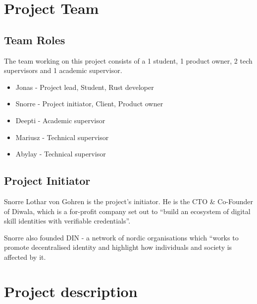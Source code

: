 \hypertarget{project-team}{%
\section{Project Team}\label{project-team}}

\hypertarget{team-roles}{%
\subsection{Team Roles}\label{team-roles}}

The team working on this project consists of a 1 student, 1 product
owner, 2 tech supervisors and 1 academic supervisor.

\begin{itemize}
\tightlist
\item
    Jonas - Project lead, Student, Rust developer
\item
    Snorre - Project initiator, Client, Product owner
\item
    Deepti - Academic supervisor
\item
    Mariusz - Technical supervisor
\item
    Abylay - Technical supervisor
\end{itemize}


\hypertarget{project-initiator}{%
\subsection{Project Initiator}\label{project-initiator}}

Snorre Lothar von Gohren is the project's initiator. He is the CTO \& Co-Founder of Diwala, which is a for-profit company set out to ``build an ecosystem of digital skill identities with verifiable credentials''.

Snorre also founded DIN - a network of nordic organisations which ``works to
promote decentralised identity and highlight how individuals and society
is affected by it.



\pagebreak



\hypertarget{project-description}{%
\section{Project description}\label{project-description}}

